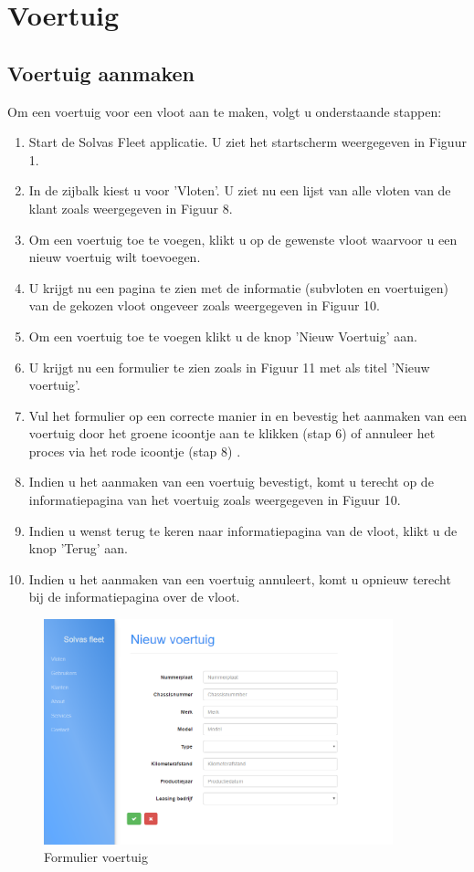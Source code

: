 \documentclass[11pt,openany]{article}
\begin{document}
\newpage
\section{Voertuig}
\subsection{Voertuig aanmaken}
Om een voertuig voor een vloot aan te maken, volgt u onderstaande stappen:
\begin{enumerate}
	\item Start de Solvas Fleet applicatie. U ziet het startscherm weergegeven in Figuur 1.
	\item In de zijbalk kiest u voor 'Vloten'. U ziet nu een lijst van alle vloten van de klant zoals weergegeven in Figuur 8.
	\item Om een voertuig toe te voegen, klikt u op de gewenste vloot waarvoor u een nieuw voertuig wilt toevoegen. 
	\item U krijgt nu een pagina te zien met de informatie (subvloten en voertuigen) van de gekozen vloot
	ongeveer zoals weergegeven in Figuur 10. 
	\item Om een voertuig toe te voegen klikt u de knop 'Nieuw Voertuig' aan.
	\item U krijgt nu een formulier te zien zoals in Figuur 11 met als titel 'Nieuw voertuig'.
	\item Vul het formulier op een correcte manier in en bevestig het aanmaken van een voertuig door het groene icoontje aan te klikken (stap 6) of annuleer het proces via het rode icoontje (stap 8) .
	\item Indien u het aanmaken van een voertuig bevestigt, komt u terecht op de informatiepagina van het voertuig zoals weergegeven in Figuur 10. 
	\item Indien u wenst terug te keren  naar informatiepagina van de vloot, klikt u de knop 'Terug' aan.
	\item Indien u het aanmaken van een voertuig annuleert, komt u opnieuw terecht bij de informatiepagina over de vloot.
\end{enumerate}


\begin{figure}
	\centering
	\includegraphics[width=0.9\textwidth]{fig11.png}
	\caption{Formulier voertuig}
\end{figure}
\end{document}
